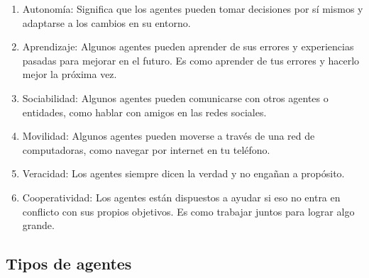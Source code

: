 \begin{enumerate}
    \item Autonomía: Significa que los agentes pueden tomar decisiones por sí mismos y adaptarse 
    a los cambios en su entorno.
    
    \item Aprendizaje: Algunos agentes pueden aprender de sus errores y experiencias pasadas para 
    mejorar en el futuro. Es como aprender de tus errores y hacerlo mejor la próxima vez.
    
    \item Sociabilidad: Algunos agentes pueden comunicarse con otros agentes o entidades, como 
    hablar con amigos en las redes sociales.
    
    \item Movilidad: Algunos agentes pueden moverse a través de una red de computadoras, como 
    navegar por internet en tu teléfono.
    
    \item Veracidad: Los agentes siempre dicen la verdad y no engañan a propósito.
    
    \item Cooperatividad: Los agentes están dispuestos a ayudar si eso no entra en conflicto con 
    sus propios objetivos. Es como trabajar juntos para lograr algo grande.    
\end{enumerate}


\subsection*{Tipos de agentes}

